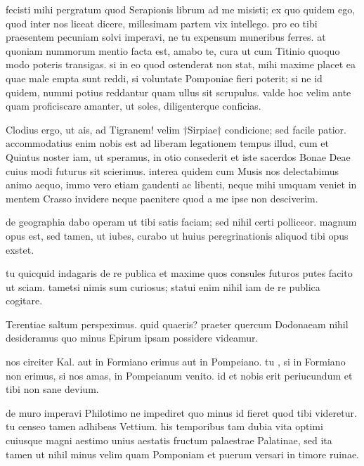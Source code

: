 


 fecisti mihi pergratum quod Serapionis librum ad me misisti; ex quo quidem ego, quod inter nos liceat dicere, millesimam partem vix intellego. pro eo tibi praesentem pecuniam solvi imperavi, ne tu expensum muneribus ferres. at quoniam nummorum mentio facta est, amabo te, cura ut cum Titinio quoquo modo poteris transigas. si in eo quod ostenderat non stat, mihi maxime placet ea quae male empta sunt reddi, si voluntate Pomponiae fieri poterit; si ne id quidem, nummi potius reddantur quam ullus sit scrupulus. valde hoc velim ante quam proficiscare amanter, ut soles, diligenterque conficias.

 Clodius ergo, ut ais, ad Tigranem! velim †Sirpiae† condicione; sed facile patior. accommodatius enim nobis est ad liberam legationem tempus illud, cum et Quintus noster iam, ut speramus, in otio consederit et iste sacerdos Bonae Deae cuius modi futurus sit scierimus. interea quidem cum Musis nos delectabimus animo aequo, immo vero etiam gaudenti ac libenti, neque mihi umquam veniet in mentem Crasso invidere neque paenitere quod a me ipse non desciverim.

 de geographia dabo operam ut tibi satis faciam; sed nihil certi polliceor. magnum opus est, sed tamen, ut iubes, curabo ut huius peregrinationis aliquod tibi opus exstet.

 tu quicquid indagaris de re publica et maxime quos consules futuros putes facito ut sciam. tametsi nimis sum curiosus; statui enim nihil iam de re publica cogitare.

 Terentiae saltum perspeximus. quid quaeris? praeter quercum Dodonaeam nihil desideramus quo minus Epirum ipsam possidere videamur.

 nos circiter Kal. aut in Formiano erimus aut in Pompeiano. tu , si in Formiano non erimus, si nos amas, in Pompeianum venito. id et nobis erit periucundum et tibi non sane devium.

 de muro imperavi Philotimo ne impediret quo minus id fieret quod tibi videretur. tu censeo tamen adhibeas Vettium. his temporibus tam dubia vita optimi cuiusque magni aestimo unius aestatis fructum palaestrae Palatinae, sed ita tamen ut nihil minus velim quam Pomponiam et puerum versari in timore ruinae.

